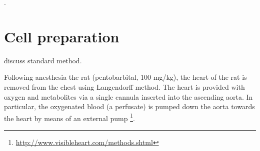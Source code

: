 \citep{bootman2000, echevarria2003, badminton1996}.



\section{Cell preparation}

\citep{} discuss standard method. 

Following anesthesia the rat (pentobarbital, 100 mg/kg), the heart of the rat is
removed from the chest using Langendorff method. The heart is provided with
oxygen and metabolites via a single cannula inserted into the ascending aorta.
In particular, the oxygenated blood (a perfusate) is pumped down the aorta
towards the heart by means of an external pump
\footnote{\url{http://www.visibleheart.com/methods.shtml}}. 


